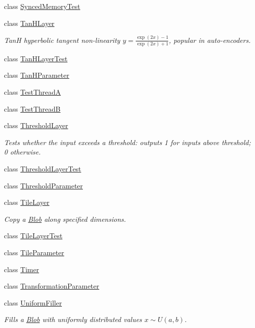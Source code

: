 \begin{DoxyCompactItemize}
class \mbox{\hyperlink{classcaffe_1_1_synced_memory_test}{Synced\+Memory\+Test}}
\item 
class \mbox{\hyperlink{classcaffe_1_1_tan_h_layer}{Tan\+H\+Layer}}
\begin{DoxyCompactList}\small\item\em TanH hyperbolic tangent non-\/linearity $ y = \frac{\exp(2x) - 1}{\exp(2x) + 1} $, popular in auto-\/encoders. \end{DoxyCompactList}\item 
class \mbox{\hyperlink{classcaffe_1_1_tan_h_layer_test}{Tan\+H\+Layer\+Test}}
\item 
class \mbox{\hyperlink{classcaffe_1_1_tan_h_parameter}{Tan\+H\+Parameter}}
\item 
class \mbox{\hyperlink{classcaffe_1_1_test_thread_a}{Test\+ThreadA}}
\item 
class \mbox{\hyperlink{classcaffe_1_1_test_thread_b}{Test\+ThreadB}}
\item 
class \mbox{\hyperlink{classcaffe_1_1_threshold_layer}{Threshold\+Layer}}
\begin{DoxyCompactList}\small\item\em Tests whether the input exceeds a threshold\+: outputs 1 for inputs above threshold; 0 otherwise. \end{DoxyCompactList}\item 
class \mbox{\hyperlink{classcaffe_1_1_threshold_layer_test}{Threshold\+Layer\+Test}}
\item 
class \mbox{\hyperlink{classcaffe_1_1_threshold_parameter}{Threshold\+Parameter}}
\item 
class \mbox{\hyperlink{classcaffe_1_1_tile_layer}{Tile\+Layer}}
\begin{DoxyCompactList}\small\item\em Copy a \mbox{\hyperlink{classcaffe_1_1_blob}{Blob}} along specified dimensions. \end{DoxyCompactList}\item 
class \mbox{\hyperlink{classcaffe_1_1_tile_layer_test}{Tile\+Layer\+Test}}
\item 
class \mbox{\hyperlink{classcaffe_1_1_tile_parameter}{Tile\+Parameter}}
\item 
class \mbox{\hyperlink{classcaffe_1_1_timer}{Timer}}
\item 
class \mbox{\hyperlink{classcaffe_1_1_transformation_parameter}{Transformation\+Parameter}}
\item 
class \mbox{\hyperlink{classcaffe_1_1_uniform_filler}{Uniform\+Filler}}
\begin{DoxyCompactList}\small\item\em Fills a \mbox{\hyperlink{classcaffe_1_1_blob}{Blob}} with uniformly distributed values $ x\sim U(a, b) $. \end{DoxyCompactList}\item 

\end{DoxyCompactItemize}

